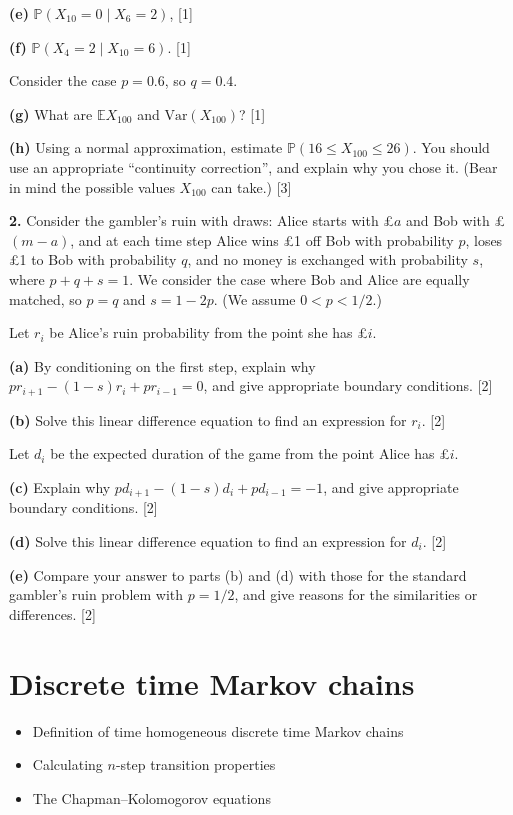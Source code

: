\documentclass[
  a4paper,
]{article}
\providecommand{\tightlist}{%
  \setlength{\itemsep}{0pt}\setlength{\parskip}{0pt}}
\theoremstyle{definition}
\theoremstyle{definition}
\theoremstyle{definition}
\theoremstyle{remark}
\begin{document}
\textbf{(e)} \(\mathbb P(X_{10} = 0 \mid X_6 = 2)\), {{[}1{]}}

\textbf{(f)} \(\mathbb P(X_4 = 2 \mid X_{10} = 6)\). {{[}1{]}}

Consider the case \(p = 0.6\), so \(q = 0.4\).

\textbf{(g)} What are \(\mathbb E X_{100}\) and \(\text{Var}(X_{100})\)? {{[}1{]}}

\textbf{(h)} Using a normal approximation, estimate \(\mathbb P(16 \leq X_{100} \leq 26)\). You should use an appropriate ``continuity correction'', and explain why you chose it. (Bear in mind the possible values \(X_{100}\) can take.) {{[}3{]}}

\textbf{2.} Consider the gambler's ruin with draws: Alice starts with £\(a\) and Bob with £\((m-a)\), and at each time step Alice wins £1 off Bob with probability \(p\), loses £1 to Bob with probability \(q\), and no money is exchanged with probability \(s\), where \(p+q+s =1\). We consider the case where Bob and Alice are equally matched, so \(p = q\) and \(s = 1-2p\). (We assume \(0 < p < 1/2\).)

Let \(r_i\) be Alice's ruin probability from the point she has £\(i\).

\textbf{(a)} By conditioning on the first step, explain why \(pr_{i+1} - (1-s)r_i + pr_{i-1} = 0\), and give appropriate boundary conditions. {{[}2{]}}

\textbf{(b)} Solve this linear difference equation to find an expression for \(r_i\). {{[}2{]}}

Let \(d_i\) be the expected duration of the game from the point Alice has £\(i\).

\textbf{(c)} Explain why \(pd_{i+1} - (1-s)d_i + pd_{i-1} = -1\), and give appropriate boundary conditions. {{[}2{]}}

\textbf{(d)} Solve this linear difference equation to find an expression for \(d_i\). {{[}2{]}}

\textbf{(e)} Compare your answer to parts (b) and (d) with those for the standard gambler's ruin problem with \(p = 1/2\), and give reasons for the similarities or differences. {{[}2{]}}

\hypertarget{S05-markov-chains}{%
\section{Discrete time Markov chains}\label{S05-markov-chains}}

\begin{itemize}
\tightlist
\item
  Definition of time homogeneous discrete time Markov chains
\item
  Calculating \(n\)-step transition properties
\item
  The Chapman--Kolomogorov equations
\end{itemize}
\end{document}
